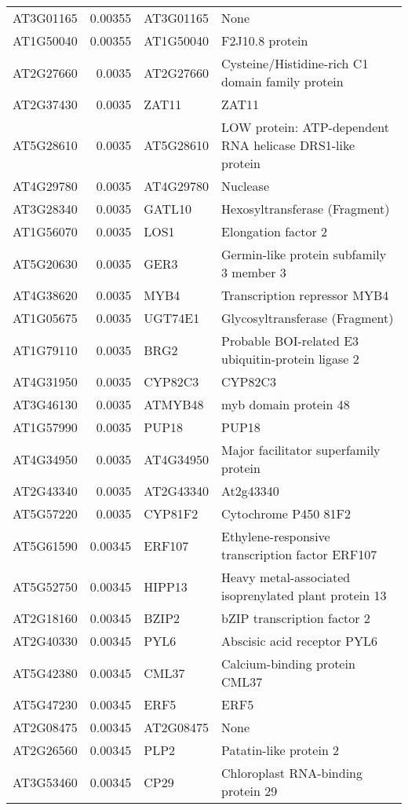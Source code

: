 \documentclass[a4paper]{article}
\begin{document}
\begin{center}
\begin{tabular}{lrll}
AT3G01165 & 0.00355 & AT3G01165 & None\\
AT1G50040 & 0.00355 & AT1G50040 & F2J10.8 protein\\
AT2G27660 & 0.0035 & AT2G27660 & Cysteine/Histidine-rich C1 domain family protein\\
AT2G37430 & 0.0035 & ZAT11 & ZAT11\\
AT5G28610 & 0.0035 & AT5G28610 & LOW protein: ATP-dependent RNA helicase DRS1-like protein\\
AT4G29780 & 0.0035 & AT4G29780 & Nuclease\\
AT3G28340 & 0.0035 & GATL10 & Hexosyltransferase (Fragment)\\
AT1G56070 & 0.0035 & LOS1 & Elongation factor 2\\
AT5G20630 & 0.0035 & GER3 & Germin-like protein subfamily 3 member 3\\
AT4G38620 & 0.0035 & MYB4 & Transcription repressor MYB4\\
AT1G05675 & 0.0035 & UGT74E1 & Glycosyltransferase (Fragment)\\
AT1G79110 & 0.0035 & BRG2 & Probable BOI-related E3 ubiquitin-protein ligase 2\\
AT4G31950 & 0.0035 & CYP82C3 & CYP82C3\\
AT3G46130 & 0.0035 & ATMYB48 & myb domain protein 48\\
AT1G57990 & 0.0035 & PUP18 & PUP18\\
AT4G34950 & 0.0035 & AT4G34950 & Major facilitator superfamily protein\\
AT2G43340 & 0.0035 & AT2G43340 & At2g43340\\
AT5G57220 & 0.0035 & CYP81F2 & Cytochrome P450 81F2\\
AT5G61590 & 0.00345 & ERF107 & Ethylene-responsive transcription factor ERF107\\
AT5G52750 & 0.00345 & HIPP13 & Heavy metal-associated isoprenylated plant protein 13\\
AT2G18160 & 0.00345 & BZIP2 & bZIP transcription factor 2\\
AT2G40330 & 0.00345 & PYL6 & Abscisic acid receptor PYL6\\
AT5G42380 & 0.00345 & CML37 & Calcium-binding protein CML37\\
AT5G47230 & 0.00345 & ERF5 & ERF5\\
AT2G08475 & 0.00345 & AT2G08475 & None\\
AT2G26560 & 0.00345 & PLP2 & Patatin-like protein 2\\
AT3G53460 & 0.00345 & CP29 & Chloroplast RNA-binding protein 29\\

\end{tabular}
\end{center}
\end{document}
